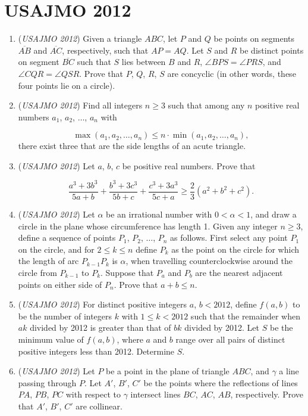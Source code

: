 \section{USAJMO 2012}
        \begin{enumerate}
        	\item (\textit{USAJMO 2012}) Given a triangle $ABC$, let $P$ and $Q$ be points on segments $\overline{AB}$ and $\overline{AC}$, respectively, such that $AP = AQ$.  Let $S$ and $R$ be distinct points on segment $\overline{BC}$ such that $S$ lies between $B$ and $R$, $\angle BPS = \angle PRS$, and $\angle CQR = \angle QSR$.  Prove that $P$, $Q$, $R$, $S$ are concyclic (in other words, these four points lie on a circle).


 

	\item (\textit{USAJMO 2012}) Find all integers $n \ge 3$ such that among any $n$ positive real numbers $a_1$, $a_2$, $\dots$, $a_n$ with

 \[\max(a_1, a_2, \dots, a_n) \le n \cdot \min(a_1, a_2, \dots, a_n),\]
there exist three that are the side lengths of an acute triangle.


 

	\item (\textit{USAJMO 2012}) Let $a$, $b$, $c$ be positive real numbers.  Prove that

 \[\frac{a^3 + 3b^3}{5a + b} + \frac{b^3 + 3c^3}{5b + c} + \frac{c^3 + 3a^3}{5c + a} \ge \frac{2}{3} (a^2 + b^2 + c^2).\]


	\item (\textit{USAJMO 2012}) Let $\alpha$ be an irrational number with $0 < \alpha < 1$, and draw a circle in the plane whose circumference has length 1.  Given any integer $n \ge 3$, define a sequence of points $P_1$, $P_2$, $\dots$, $P_n$ as follows.  First select any point $P_1$ on the circle, and for $2 \le k \le n$ define $P_k$ as the point on the circle for which the length of arc $P_{k - 1} P_k$ is $\alpha$, when travelling counterclockwise around the circle from $P_{k - 1}$ to $P_k$.  Suppose that $P_a$ and $P_b$ are the nearest adjacent points on either side of $P_n$.  Prove that $a + b \le n$.


 

	\item (\textit{USAJMO 2012}) For distinct positive integers $a$, $b < 2012$, define $f(a,b)$ to be the number of integers $k$ with $1 \le k < 2012$ such that the remainder when $ak$ divided by 2012 is greater than that of $bk$ divided by 2012.  Let $S$ be the minimum value of $f(a,b)$, where $a$ and $b$ range over all pairs of distinct positive integers less than 2012.  Determine $S$.


 

	\item (\textit{USAJMO 2012}) Let $P$ be a point in the plane of triangle $ABC$, and $\gamma$ a line passing through $P$.  Let $A'$, $B'$, $C'$ be the points where the reflections of lines $PA$, $PB$, $PC$ with respect to $\gamma$ intersect lines $BC$, $AC$, $AB$, respectively.  Prove that $A'$, $B'$, $C'$ are collinear.


 

\end{enumerate}